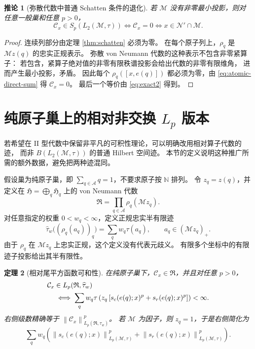 \documentclass[UTF8,11pt,a4paper,fontset=fandol]{ctexart}
\newtheorem{theorem}{定理}[section]
\newtheorem{corollary}[theorem]{推论}
\theoremstyle{remark}
\numberwithin{equation}{section}
\newcommand{\M}{\mathcal M}
\newcommand{\N}{\mathcal N}
\newcommand{\CC}{\mathcal C}
\newcommand{\HH}{\mathfrak H}
\newcommand{\norm}[1]{\left\lVert #1\right\rVert}
\begin{document}
\begin{corollary}[弥散代数中普通 Schatten 条件的退化]\label{cor:diffuse}
若 $\M$ 没有非零最小投影，则对任意一般巢和任意 $p>0$，
\[
 \CC_x\in S_p(L_2(\M,\tau))
 \iff\CC_x=0
 \iff x\in\N'\cap\M.
\]
\end{corollary}

\begin{proof}
连续列部分由定理 \ref{thm:schatten} 必须为零。
在每个原子列上，$\rho_q$ 是 $\M z(q)$ 的忠实正规表示。
弥散 von Neumann 代数的这种表示不包含非零紧算子：
若包含，紧算子绝对值的非零有限秩谱投影会给出代数的非零有限维角，
进而产生最小投影，矛盾。
因此每个 $\rho_q([x,e(q)])$ 都必须为零，由 \eqref{eq:atomic-direct-sum} 得 $\CC_x=0$。
最后一个等价由 \eqref{eq:exact2} 得到。
\end{proof}

\section{纯原子巢上的相对非交换 \texorpdfstring{$L_p$}{Lp} 版本}

若希望在 II 型代数中保留非平凡的可积性理论，可以明确改用相对算子代数的迹，
而非 $B(L_2(\M,\tau))$ 的普通 Hilbert 空间迹。
本节的定义说明这种推广所需的额外数据，避免把两种迹混同。

假设巢为纯原子巢，即 $\sum_{q\in\mathscr A}q=1$，不要求原子按 $\mathbb N$ 排列。
令 $z_q=z(q)$，并定义在 $\HH=\bigoplus_q\HH_q$ 上的 von Neumann 代数
\[
 \mathfrak R=\prod_{q\in\mathscr A}\rho_q(\M z_q).
\]
对任意指定的权重 $0<w_q<\infty$，定义正规忠实半有限迹
\begin{equation}\label{eq:relative-trace}
 \widehat\tau_w\bigl((\rho_q(a_q))_q\bigr)
 =\sum_qw_q\tau(a_q),\qquad a_q\in(\M z_q)_+.
\end{equation}
由于 $\rho_q$ 在 $\M z_q$ 上忠实正规，这个定义没有代表元歧义。
有限多个坐标中的有限迹子投影给出其半有限性。

\begin{theorem}[相对尾平方函数可和性]\label{thm:relative}
在纯原子巢下，$\CC_x\in\mathfrak R$，并且对任意 $p>0$，
\begin{align}
 &\CC_x\in L_p(\mathfrak R,\widehat\tau_w)\notag\\
 &\quad\iff
 \sum_qw_q\tau\left(z_q\left[
 s_c(e(q);x)^p+s_r(e(q);x)^p\right]\right)<\infty.\label{eq:relative-condition}
\end{align}
右侧级数精确等于 $\norm{\CC_x}_{L_p(\mathfrak R,\widehat\tau_w)}^p$。
若 $\M$ 为因子，则 $z_q=1$，于是右侧简化为
\[
 \sum_qw_q\left(
  \norm{s_c(e(q);x)}_{L_p(\M,\tau)}^p+
  \norm{s_r(e(q);x)}_{L_p(\M,\tau)}^p\right).
\]
\end{theorem}
\end{document}
